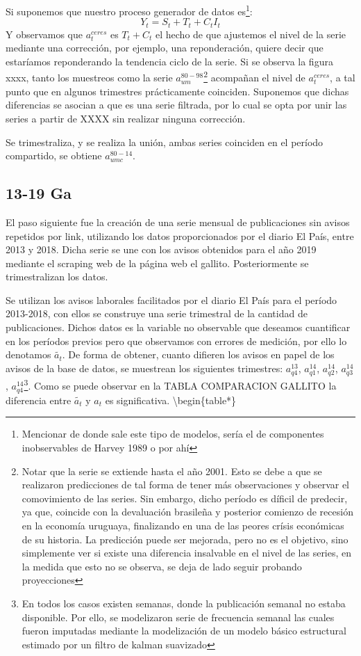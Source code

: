 \documentclass[12pt,twoside]{reedthesis}
\begin{document}
Si suponemos que nuestro proceso generador de datos es\footnote{Mencionar de donde sale este tipo de modelos, sería el de componentes inobservables de Harvey 1989 o por ahí}:
\begin{equation}
Y_t = S_t + T_t + C_t  I_t
\end{equation}
Y observamos que \(a_t^{ceres}\) es \(T_t + C_t\) el hecho de que ajustemos el nivel de la serie mediante una corrección, por ejemplo, una reponderación, quiere decir que estaríamos reponderando la tendencia ciclo de la serie. Si se observa la figura xxxx, tanto los muestreos como la serie \(a_{um}^{80-98}\)\footnote{Notar que la serie se extiende hasta el año 2001. Esto se debe a que se realizaron predicciones de tal forma de tener más observaciones y observar el comovimiento de las series. Sin embargo, dicho período es díficil de predecir, ya que, coincide con la devaluación brasileña y posterior comienzo de recesión en la economía uruguaya, finalizando en una de las peores crísis económicas de su historia. La predicción puede ser mejorada, pero no es el objetivo, sino simplemente ver si existe una diferencia insalvable en el nivel de las series, en la medida que esto no se observa, se deja de lado seguir probando proyecciones} acompañan el nivel de \(a_t^{ceres}\), a tal punto que en algunos trimestres prácticamente coinciden. Suponemos que dichas diferencias se asocian a que es una serie filtrada, por lo cual se opta por unir las series a partir de XXXX sin realizar ninguna corrección.

Se trimestraliza, y se realiza la unión, ambas series coinciden en el período compartido, se obtiene \(a_{umc}^{80-14}\).

\hypertarget{ga}{%
\subsection{13-19 Ga}\label{ga}}

El paso siguiente fue la creación de una serie mensual de publicaciones sin avisos repetidos por link, utilizando los datos proporcionados por el diario El País, entre 2013 y 2018. Dicha serie se une con los avisos obtenidos para el año 2019 mediante el scraping web de la página web el gallito. Posteriormente se trimestralizan los datos.

Se utilizan los avisos laborales facilitados por el diario El País para el período 2013-2018, con ellos se construye una serie trimestral de la cantidad de publicaciones.
Dichos datos es la variable no observable que deseamos cuantificar en los períodos previos pero que observamos con errores de medición, por ello lo denotamos \(\tilde{a_t}\). De forma de obtener, cuanto difieren los avisos en papel de los avisos de la base de datos, se muestrean los siguientes trimestres: \(a_{q4}^{13}\), \(a_{q1}^{14}\), \(a_{q2}^{14}\), \(a_{q3}^{14}\), \(a_{q4}^{14}\)\footnote{En todos los casos existen semanas, donde la publicación semanal no estaba disponible. Por ello, se modelizaron serie de frecuencia semanal las cuales fueron imputadas mediante la modelización de un modelo básico estructural estimado por un filtro de kalman suavizado}. Como se puede observar en la TABLA COMPARACION GALLITO la diferencia entre \(\tilde{a_t}\) y \({a_t}\) es significativa.
\textbackslash{}begin\{table*\}
\end{document}

